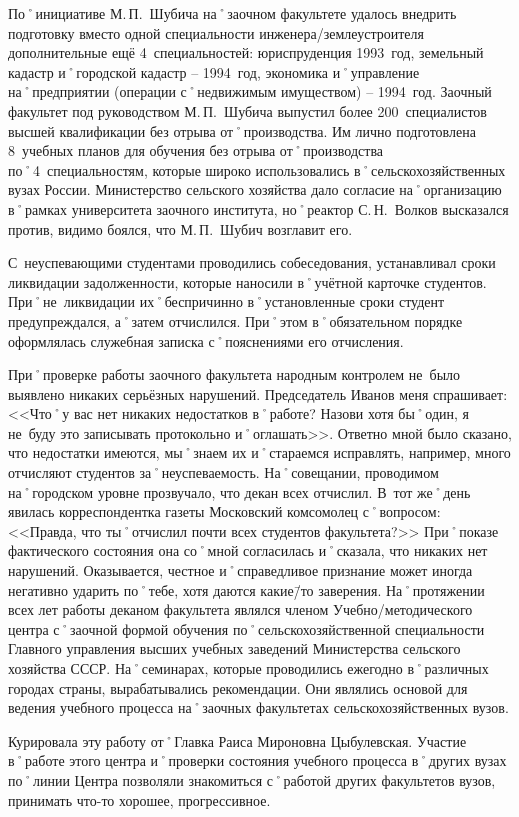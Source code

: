 По˚инициативе М.\,П.~Шубича на˚заочном факультете удалось внедрить подготовку вместо одной специальности инженера\-/землеустроителя дополнительные ещё 4~специальностей: юриспруденция 1993~год, земельный кадастр и˚городской кадастр \--- 1994~год, экономика и˚управление на˚предприятии (операции с˚недвижимым имуществом) \--- 1994~год. Заочный факультет под руководством М.\,П.~Шубича выпустил более 200~специалистов высшей квалификации без отрыва от˚производства. Им лично подготовлена 8~учебных планов для обучения без отрыва от˚производства по˚4~специальностям, которые широко использовались в˚сельскохозяйственных вузах России. Министерство сельского хозяйства дало согласие на˚организацию в˚рамках университета заочного института, но˚реактор С.\,Н.~Волков высказался против, видимо боялся, что М.\,П.~Шубич возглавит его.

С~неуспевающими студентами проводились собеседования, устанавливал сроки ликвидации задолженности, которые наносили в˚учётной карточке студентов. При˚не~ликвидации их˚беспричинно в˚установленные сроки студент предупреждался, а˚затем отчислился. При˚этом в˚обязательном порядке оформлялась служебная записка с˚пояснениями его отчисления.

При˚проверке работы заочного факультета народным контролем не~было выявлено никаких серьёзных нарушений. Председатель Иванов меня спрашивает: <<Что˚у вас нет никаких недостатков в˚работе? Назови хотя бы˚один, я не~буду это записывать протокольно и˚оглашать>>. Ответно мной было сказано, что недостатки имеются, мы˚знаем их и˚стараемся исправлять, например, много отчисляют студентов за˚неуспеваемость. На˚совещании, проводимом на˚городском уровне прозвучало, что декан всех отчислил. В~тот же˚день явилась корреспондентка газеты Московский комсомолец с˚вопросом: <<Правда, что ты˚отчислил почти всех студентов факультета?>> При˚показе фактического состояния она со˚мной согласилась и˚сказала, что никаких нет нарушений. Оказывается, честное и˚справедливое признание может иногда негативно ударить по˚тебе, хотя даются какие\=/то заверения. На˚протяжении всех лет работы деканом факультета являлся членом Учебно\-/методического центра с˚заочной формой обучения по˚сельскохозяйственной специальности Главного управления высших учебных заведений Министерства сельского хозяйства СССР. На˚семинарах, которые проводились ежегодно в˚различных городах страны, вырабатывались рекомендации. Они являлись основой для ведения учебного процесса на˚заочных факультетах сельскохозяйственных вузов.

Курировала эту работу от˚Главка Раиса Мироновна Цыбулевская. Участие в˚работе этого центра и˚проверки состояния учебного процесса в˚других вузах по˚линии Центра позволяли знакомиться с˚работой других факультетов вузов, принимать что-то хорошее, прогрессивное.

